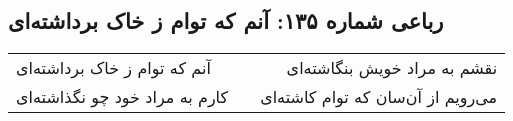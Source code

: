 \begin{center}
\section*{رباعی شماره ۱۳۵: آنم که توام ز خاک برداشته‌ای}
\label{sec:135}
\begin{longtable}{l p{0.5cm} r}
آنم که توام ز خاک برداشته‌ای
&&
نقشم به مراد خویش بنگاشته‌ای
\\
کارم به مراد خود چو نگذاشته‌ای
&&
می‌رویم از آن‌سان که توام کاشته‌ای
\\
\end{longtable}
\end{center}
